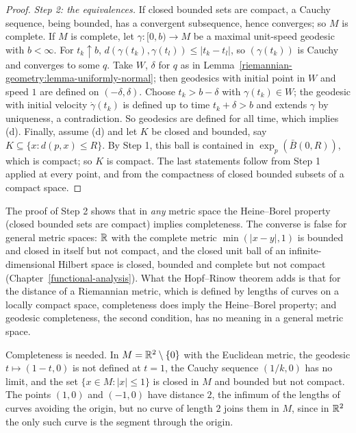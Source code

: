 \begin{proof}
\emph{Step 2: the equivalences.} If closed bounded sets are compact, a Cauchy sequence, being bounded, has a convergent subsequence, hence converges; so $M$ is complete. If $M$ is complete, let $\gamma \colon [0, b) \to M$ be a maximal unit-speed
geodesic with $b < \infty$. For $t_k \uparrow b$, $d(\gamma(t_k), \gamma(t_l)) \leq |t_k - t_l|$, so $(\gamma(t_k))$ is Cauchy and converges to some $q$. Take $W$, $\delta$ for $q$ as in Lemma~\ref{riemannian-geometry:lemma-uniformly-normal}; then
geodesics with initial point in $W$ and speed $1$ are defined on $(-\delta, \delta)$. Choose $t_k > b - \delta$ with $\gamma(t_k) \in W$; the geodesic with initial velocity $\dot\gamma(t_k)$ is defined up to time $t_k + \delta > b$ and extends $\gamma$ by
uniqueness, a contradiction. So geodesics are defined for all time, which implies (d). Finally, assume (d) and let $K$ be closed and bounded, say $K \subseteq \{x : d(p, x) \leq R\}$. By Step 1, this ball is contained in
$\exp_p(\bar B(0, R))$, which is compact; so $K$ is compact. The last statements follow from Step 1 applied at every point, and from the compactness of closed bounded subsets of a compact space.
\end{proof}

\begin{remark}\label{riemannian-geometry:remark-heine-borel}
The proof of Step 2 shows that in \emph{any} metric space the Heine--Borel property (closed bounded sets are compact) implies completeness. The converse is false for general metric spaces: $\mathbb{R}$ with
the complete metric $\min(|x - y|, 1)$ is bounded and closed in itself but not compact, and the closed unit ball of an infinite-dimensional Hilbert space is closed, bounded and complete but not
compact (Chapter~\ref{functional-analysis}). What the Hopf--Rinow theorem adds is that for the distance of a Riemannian metric, which is defined by lengths of curves on a locally compact space,
completeness does imply the Heine--Borel property; and geodesic completeness, the second condition, has no meaning in a general metric space.
\end{remark}

\begin{counterexample}\label{riemannian-geometry:counterexample-incomplete}
Completeness is needed. In $M = \mathbb{R}^2 \setminus \{0\}$ with the Euclidean metric, the geodesic $t \mapsto (1 - t, 0)$ is not defined at $t = 1$, the Cauchy sequence $(1/k, 0)$ has no limit, and the set $\{x \in M : |x| \leq 1\}$ is closed in $M$
and bounded but not compact. The points $(1, 0)$ and $(-1, 0)$ have distance $2$, the infimum of the lengths of curves avoiding the origin, but no
curve of length $2$ joins them in $M$, since in $\mathbb{R}^2$ the only such curve is the segment through the origin.
\end{counterexample}

